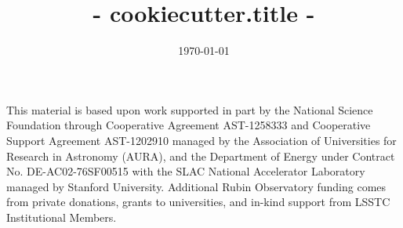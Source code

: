 \documentclass[modern]{aastex7}
\begin{document}

\date{\today}
\title{ {{- cookiecutter.title -}} }








\begin{acknowledgments}
This material is based upon work supported in part by the National Science Foundation through Cooperative Agreement AST-1258333 and Cooperative Support Agreement AST-1202910 managed by the Association of Universities for Research in Astronomy (AURA), and the Department of Energy under Contract No. DE-AC02-76SF00515 with the SLAC National Accelerator Laboratory managed by Stanford University.
Additional Rubin Observatory funding comes from private donations, grants to universities, and in-kind support from LSSTC Institutional Members.
\end{acknowledgments}

%

\vspace{5mm}

\end{document}
